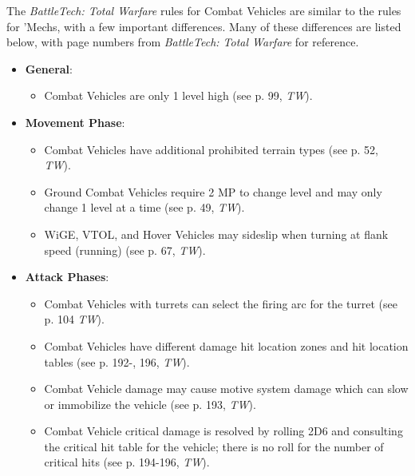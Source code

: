 The \emph{BattleTech: Total Warfare} rules for Combat Vehicles are similar to the rules for 'Mechs, with a few important differences.
Many of these differences are listed below, with page numbers from \emph{BattleTech: Total Warfare} for reference.

\begin{itemize}

  \item {\bfseries General}:

  \begin{itemize}

    \item Combat Vehicles are only 1 level high (see p. 99, \emph{TW}).

  \end{itemize}

  \item {\bfseries Movement Phase}:

  \begin{itemize}

    \item Combat Vehicles have additional prohibited terrain types (see p. 52, \emph{TW}).

    \item Ground Combat Vehicles require 2 MP to change level and may only change 1 level at a time (see p. 49, \emph{TW}).

    \item WiGE, VTOL, and Hover Vehicles may sideslip when turning at flank speed (running) (see p. 67, \emph{TW}).

  \end{itemize}

  \item {\bfseries Attack Phases}:

  \begin{itemize}

    \item Combat Vehicles with turrets can select the firing arc for the turret (see p. 104 \emph{TW}).

    \item Combat Vehicles have different damage hit location zones and hit location tables (see p. 192-, 196, \emph{TW}).

    \item Combat Vehicle damage may cause motive system damage which can slow or immobilize the vehicle (see p. 193, \emph{TW}).

    \item Combat Vehicle critical damage is resolved by rolling 2D6 and consulting the critical hit table for the vehicle; there is no roll for the number of critical hits (see p. 194-196, \emph{TW}).


\end{itemize}
\end{itemize}
